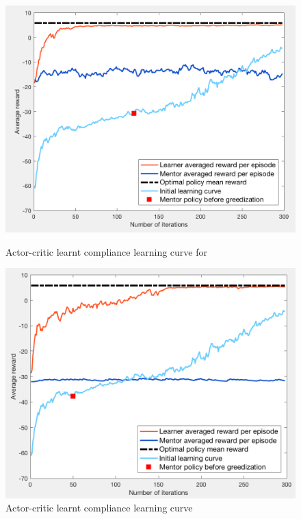 \documentclass[a4paper]{report}
\begin{document}
{{{{				\begin{figure}[h!]
					\begin{minipage}{0.5\linewidth}
						\begin{center}
							\includegraphics[width=0.95\linewidth]{ac_il_subopt_120}
							\caption{Actor-critic learnt compliance learning curve for }
							\label{fig::ac_il_subopt_120}
						\end{center}
					\end{minipage}
					\begin{minipage}{0.5\linewidth}
						\begin{center}
							\includegraphics[width=0.95\linewidth]{ac_il_subopt_50}
							\caption{Actor-critic learnt compliance learning curve}
							\label{fig::ac_il_subopt_50}
						\end{center}
					\end{minipage}
				\end{figure}
				
}}}}
\end{document}
